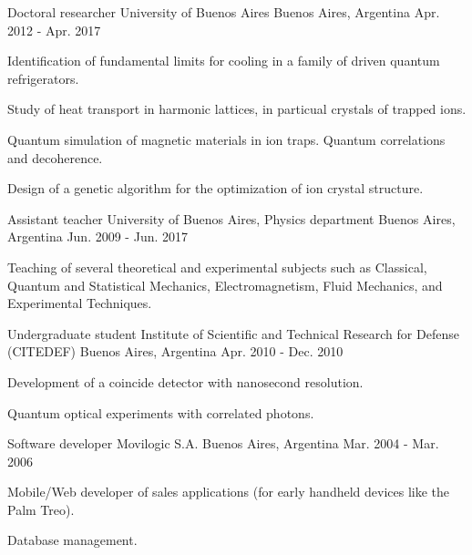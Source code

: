 \begin{cventries}
  \cventry
    {Doctoral researcher} %
    {University of Buenos Aires} %
    {Buenos Aires, Argentina} %
    {Apr. 2012 - Apr. 2017} %
    {
      \begin{cvitems} %
        \item Identification of fundamental limits for cooling in a family of driven quantum refrigerators.
        \item Study of heat transport in harmonic lattices, in particual crystals of trapped ions.
        \item Quantum simulation of magnetic materials in ion traps. Quantum correlations and decoherence.
        \item Design of a genetic algorithm for the optimization of ion crystal structure.
      \end{cvitems}
    }

  \cventry
    {Assistant teacher} %
    {University of Buenos Aires, Physics department} %
    {Buenos Aires, Argentina} %
    {Jun. 2009 - Jun. 2017} %
    {
      \begin{cvitems} %
        \item Teaching of several theoretical and experimental subjects such as Classical, Quantum and Statistical Mechanics,
        Electromagnetism, Fluid Mechanics, and Experimental Techniques.
      \end{cvitems}
    }

  \cventry
    {Undergraduate student} %
    {Institute of Scientific and Technical Research for Defense (CITEDEF)} %
    {Buenos Aires, Argentina} %
    {Apr. 2010 - Dec. 2010} %
    {
      \begin{cvitems} %
        \item Development of a coincide detector with nanosecond resolution.
        \item Quantum optical experiments with correlated photons.
      \end{cvitems}
    }

  \cventry
    {Software developer} %
    {Movilogic S.A.} %
    {Buenos Aires, Argentina} %
    {Mar. 2004 - Mar. 2006} %
    {
      \begin{cvitems}
        \item Mobile/Web developer of sales applications (for early handheld devices like the Palm Treo).
        \item Database management.
      \end{cvitems}
    }



\end{cventries}
